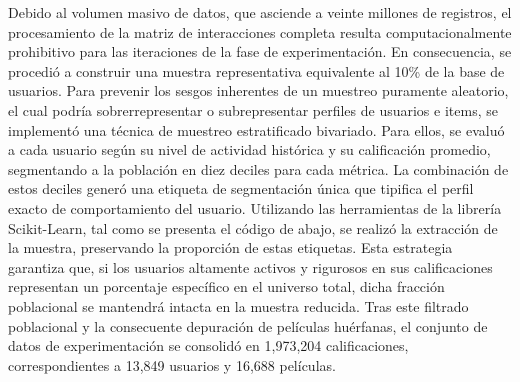 \documentclass[11pt,a4paper]{article}
\begin{document}
Debido al volumen masivo de datos, que asciende a veinte millones de registros, el procesamiento de la matriz de interacciones completa resulta computacionalmente prohibitivo para las iteraciones de la fase de experimentación. En consecuencia, se procedió a construir una muestra representativa equivalente al 10\% de la base de usuarios. Para prevenir los sesgos inherentes de un muestreo puramente aleatorio, el cual podría sobrerrepresentar o subrepresentar perfiles de usuarios e items, se implementó una técnica de muestreo estratificado bivariado. Para ellos, se evaluó a cada usuario según su nivel de actividad histórica y su calificación promedio, segmentando a la población en diez deciles para cada métrica. La combinación de estos deciles generó una etiqueta de segmentación única que tipifica el perfil exacto de comportamiento del usuario. Utilizando las herramientas de la librería Scikit-Learn, tal como se presenta el código de abajo, se realizó la extracción de la muestra, preservando la proporción de estas etiquetas. Esta estrategia garantiza que, si los usuarios altamente activos y rigurosos en sus calificaciones representan un porcentaje específico en el universo total, dicha fracción poblacional se mantendrá intacta en la muestra reducida. Tras este filtrado poblacional y la consecuente depuración de películas huérfanas, el conjunto de datos de experimentación se consolidó en 1,973,204 calificaciones, correspondientes a 13,849 usuarios y 16,688 películas.
\end{document}
